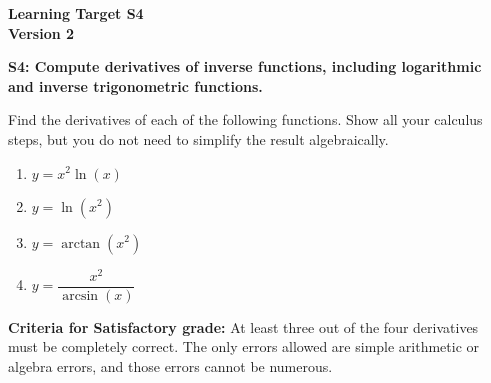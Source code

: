 \documentclass[10pt]{article}
\begin{document}
	\vspace*{0in}

		\begin{center}
			\textbf{Learning Target S4 \\
			Version 2} 
		\end{center}


\begin{framed}
	\textbf{S4: Compute derivatives of inverse functions, including logarithmic and inverse trigonometric functions.}
\end{framed}

Find the derivatives of each of the following functions. Show all your calculus steps, but you do not need to simplify the result algebraically. 

\begin{enumerate}
    \item $y = x^2 \ln(x)$
    \item $y = \ln (x^2)$
    \item $y = \arctan(x^2)$
    \item $y = \dfrac{x^2}{\arcsin(x)}$
\end{enumerate}

\vfill


\begin{small}
    \begin{framed}
        	\textbf{Criteria for Satisfactory grade:} At least three out of the four derivatives must be completely correct. The only errors allowed are simple arithmetic or algebra errors, and those errors cannot be numerous.
    \end{framed}

\end{small}
\end{document}
